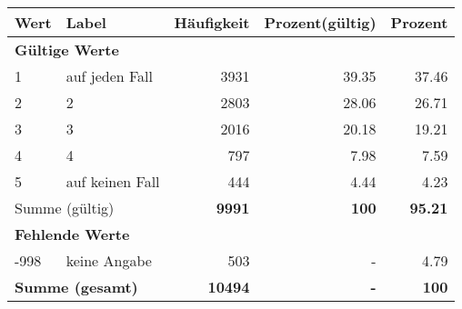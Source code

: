      \begin{longtable}{lXrrr}
     \toprule
     \textbf{Wert} & \textbf{Label} & \textbf{Häufigkeit} & \textbf{Prozent(gültig)} & \textbf{Prozent} \\
     \endhead
     \midrule
     \multicolumn{5}{l}{\textbf{Gültige Werte}}\\

     1 &
     \multicolumn{1}{X}{ auf jeden Fall   } &


       \num{3931} &
       \num[round-mode=places,round-precision=2]{39.35} &
         \num[round-mode=places,round-precision=2]{37.46} \\

     2 &
     \multicolumn{1}{X}{ 2   } &


       \num{2803} &
       \num[round-mode=places,round-precision=2]{28.06} &
         \num[round-mode=places,round-precision=2]{26.71} \\

     3 &
     \multicolumn{1}{X}{ 3   } &


       \num{2016} &
       \num[round-mode=places,round-precision=2]{20.18} &
         \num[round-mode=places,round-precision=2]{19.21} \\

     4 &
     \multicolumn{1}{X}{ 4   } &


       \num{797} &
       \num[round-mode=places,round-precision=2]{7.98} &
         \num[round-mode=places,round-precision=2]{7.59} \\

     5 &
     \multicolumn{1}{X}{ auf keinen Fall   } &


       \num{444} &
       \num[round-mode=places,round-precision=2]{4.44} &
         \num[round-mode=places,round-precision=2]{4.23} \\
     \midrule
     \multicolumn{2}{l}{Summe (gültig)} &
       \textbf{\num{9991}} &
     \textbf{\num{100}} &
       \textbf{\num[round-mode=places,round-precision=2]{95.21}} \\
     \multicolumn{5}{l}{\textbf{Fehlende Werte}}\\
       -998 &
       keine Angabe &
         \num{503} &
        - &
         \num[round-mode=places,round-precision=2]{4.79} \\
     \midrule
     \multicolumn{2}{l}{\textbf{Summe (gesamt)}} &
          \textbf{\num{10494}} &
        \textbf{-} &
        \textbf{\num{100}} \\
     \bottomrule
     \end{longtable}
     
